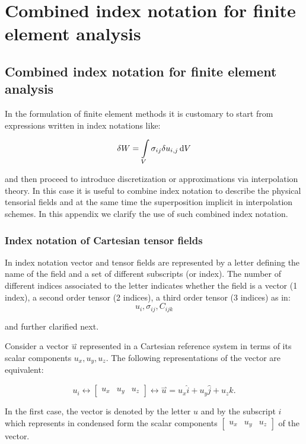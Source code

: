 %
\chapter{Combined index notation for finite element analysis}

\section{Combined index notation for finite element analysis}
In the formulation of finite element methods it is customary to start from expressions written in index notations like:


\[ \delta W = \int\limits_V \sigma_{ij} \delta u_{i,j} \dd{V} \]


and then proceed to introduce discretization or approximations via interpolation theory. In this case it is useful to combine index notation to describe the physical tensorial fields and at the same time the superposition implicit in interpolation schemes. In this appendix we clarify the use of such combined index notation.

\subsection{Index notation of Cartesian tensor fields}

In index notation vector and tensor fields are represented by a letter defining 
the name of the field and a set of different subscripts (or index). The 
number of different indices associated to the letter indicates whether the 
field is a vector (1 index), a second order tensor (2 indices), a third order 
tensor (3 indices) as in:
\[u_i , \sigma_{ij} , C_{ijk}\]

and further clarified next.
 
Consider a vector $\overset\rightharpoonup u$ represented in a Cartesian reference system in terms of its scalar components $u_x , u_y , u_z$. The following representations of the vector are equivalent:

\[u_i\leftrightarrow\begin{bmatrix}u_x&u_y&u_z\end{bmatrix}\leftrightarrow\overset\rightharpoonup u=u_x\widehat i+u_y\widehat j+u_z\widehat k.\]

In the first case, the vector is denoted by the letter $u$ and by the subscript $i$ which represents in condensed form the scalar components $\begin{bmatrix}u_x&u_y&u_z\end{bmatrix}$ of the vector.

